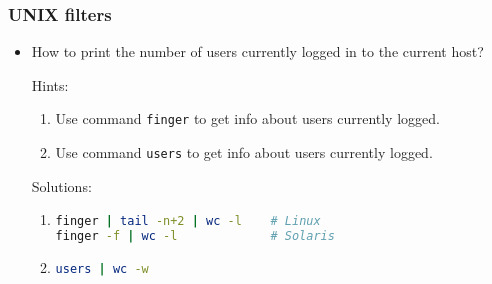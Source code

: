 \begin{frame}[fragile]
\frametitle{UNIX filters}
	\begin{itemize}
	
		\item How to print the number of users currently logged in to the current host?
			
			\vspace{5mm} 
			Hints: 
			\begin{enumerate}
				\item Use command \texttt{finger} to get info about users currently logged. 
				\item Use command \texttt{users} to get info about users currently logged. 	
			\end{enumerate}		

			\vspace{5mm}
			Solutions:
			\begin{enumerate}
				\item
\begin{lstlisting}[language=bash]
finger | tail -n+2 | wc -l    # Linux	
finger -f | wc -l             # Solaris
\end{lstlisting}

				\item
\begin{lstlisting}[language=bash]		
users | wc -w
\end{lstlisting}

			\end{enumerate}
	\end{itemize}
\end{frame}

